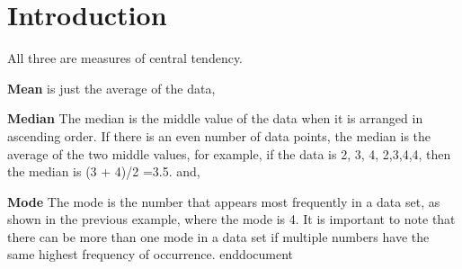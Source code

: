 



\maketitle

\section{\textbf{Introduction}}
All three are measures of central tendency.


\textbf{Mean} is just the average of the data,

\textbf{Median} The median is the middle value of the data when it is arranged in ascending order. If there is an even number of data points, the median is the average of the two middle values, for example, if the data is 2, 3, 4, 2,3,4,4, then the median is (3 + 4)/2 =3.5.
and, 

\textbf{Mode} The mode is the number that appears most frequently in a data set, as shown in the previous example, where the mode is 4. It is important to note that there can be more than one mode in a data set if multiple numbers have the same highest frequency of occurrence.
end{document}